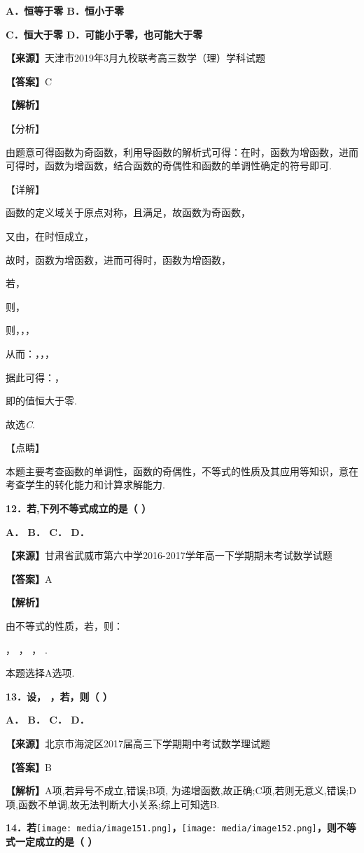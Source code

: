 \textbf{A．恒等于零 B．恒小于零}

\textbf{C．恒大于零 D．可能小于零，也可能大于零}

\textbf{【来源】}天津市2019年3月九校联考高三数学（理）学科试题

\textbf{【答案】}C

\textbf{【解析】}

【分析】

由题意可得函数为奇函数，利用导函数的解析式可得：在时，函数为增函数，进而可得时，函数为增函数，结合函数的奇偶性和函数的单调性确定的符号即可.

【详解】

函数的定义域关于原点对称，且满足，故函数为奇函数，

又由，在时恒成立，

故时，函数为增函数，进而可得时，函数为增函数，

若，

则，

则，，，

从而：，，，

据此可得：，

即的值恒大于零.

故选\emph{C}.

【点睛】

本题主要考查函数的单调性，函数的奇偶性，不等式的性质及其应用等知识，意在考查学生的转化能力和计算求解能力.

\textbf{12．若,下列不等式成立的是（ ）}

\textbf{A． B． C． D．}

\textbf{【来源】}甘肃省武威市第六中学2016-2017学年高一下学期期末考试数学试题

\textbf{【答案】}A

\textbf{【解析】}

由不等式的性质，若，则：

， ， ， .

本题选择A选项.

\textbf{13．设， ，若，则（ ）}

\textbf{A． B． C． D．}

\textbf{【来源】}北京市海淀区2017届高三下学期期中考试数学理试题

\textbf{【答案】}B

\textbf{【解析】}A项,若异号不成立,错误;B项,
为递增函数,故正确;C项,若则无意义,错误;D项,函数不单调,故无法判断大小关系;综上可知选B.

\textbf{14．若}\texttt{[image: media/image151.png]}\textbf{，}\texttt{[image: media/image152.png]}\textbf{，则不等式一定成立的是（
）}

